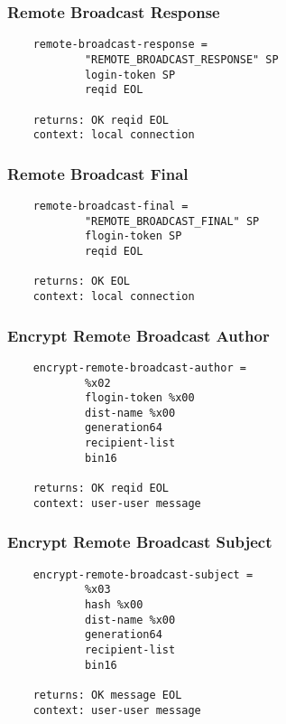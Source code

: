 \documentclass[letterpaper,11pt,oneside]{article}
\begin{document}
\subsubsection{Remote Broadcast Response}

\vspace{10pt}
\begin{verbatim}
    remote-broadcast-response =
            "REMOTE_BROADCAST_RESPONSE" SP
            login-token SP
            reqid EOL 

    returns: OK reqid EOL
    context: local connection 
\end{verbatim}
\vspace{10pt}


\subsubsection{Remote Broadcast Final}

\vspace{10pt}
\begin{verbatim}
    remote-broadcast-final =
            "REMOTE_BROADCAST_FINAL" SP 
            flogin-token SP 
            reqid EOL 

    returns: OK EOL
    context: local connection
\end{verbatim}
\vspace{10pt}


\subsubsection{Encrypt Remote Broadcast Author}

\vspace{10pt}
\begin{verbatim}
    encrypt-remote-broadcast-author = 
            %x02 
            flogin-token %x00 
            dist-name %x00 
            generation64 
            recipient-list
            bin16

    returns: OK reqid EOL
    context: user-user message
\end{verbatim}
\vspace{10pt}


\subsubsection{Encrypt Remote Broadcast Subject}

\vspace{10pt}
\begin{verbatim}
    encrypt-remote-broadcast-subject = 
            %x03 
            hash %x00 
            dist-name %x00 
            generation64 
            recipient-list 
            bin16 

    returns: OK message EOL
    context: user-user message
\end{verbatim}
\vspace{10pt}
\end{document}
